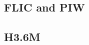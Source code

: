 \documentclass[runningheads]{llncs}
\begin{document}


\subsection{FLIC and PIW}




\subsection{H3.6M}

\end{document}
